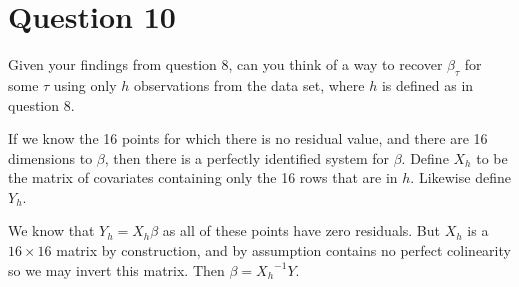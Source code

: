 \documentclass[12pt]{paper}
\newcommand{\inv}[1]{{#1}^{-1}}
\begin{document}
\section*{Question 10}

Given your findings from question 8, can you think of a way to recover
$\beta_{\tau}$ for some $\tau$ using only $h$ observations from the data set,
where $h$ is defined as in question 8.

\vspace{.3in}

If we know the 16 points for which there is no residual value, and
there are 16 dimensions to $\beta$, then there is a perfectly identified
system for $\beta$. Define $X_h$ to be the matrix of covariates containing
only the 16 rows that are in $h$. Likewise define $Y_h$.

We know that $Y_h = X_h \beta$ as all of these points have zero
residuals. But $X_h$ is a $16 \times 16$ matrix by construction, and by
assumption contains no perfect colinearity so we may invert this
matrix. Then $\beta = \inv{X_h} Y$.
\end{document}

